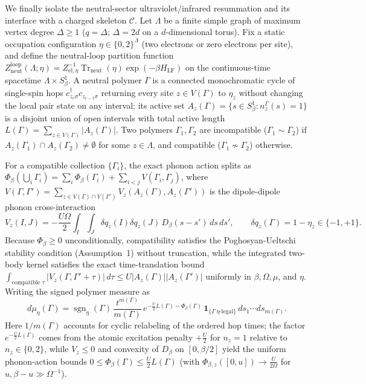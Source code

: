 \documentclass[11pt]{article}
\theoremstyle{definition}
\theoremstyle{remark}
\DeclareMathOperator{\Tr}{Tr}
\begin{document}
We finally isolate the neutral-sector ultraviolet/infrared resummation and its
interface with a charged skeleton $\mathcal{C}$. Let $\Lambda$ be a finite simple
graph of maximum vertex degree $\Delta \ge 1$ ($q = \Delta$; $\Delta = 2d$ on a
$d$-dimensional torus). Fix a static occupation configuration $\eta \in \{0,2\}^\Lambda$
(two electrons or zero electrons per site), and define the neutral-loop partition
function $Z_{\mathrm{neut}}^{\mathrm{loop}}(\Lambda; \eta) = Z_{\mathrm{el},\eta}^{-1} \Tr_{\mathrm{neut}}(\eta)\exp(-\beta H_{\mathrm{LF}})$
on the continuous-time spacetime $\Lambda \times S^1_\beta$. A neutral polymer
$\Gamma$ is a connected monochromatic cycle of single-spin hops $c_{z_r\sigma}^\dagger c_{z_{r-1}\sigma}$
returning every site $z \in V(\Gamma)$ to $\eta_z$ without changing the local
pair state on any interval; its active set $A_z(\Gamma) = \{s \in S^1_\beta : n_z^{\Gamma}(s) = 1\}$
is a disjoint union of open intervals with total active length
$L(\Gamma) = \sum_{z \in V(\Gamma)} |A_z(\Gamma)|$. Two polymers $\Gamma_1, \Gamma_2$
are incompatible ($\Gamma_1 \sim \Gamma_2$) if $A_z(\Gamma_1) \cap A_z(\Gamma_2) \ne \emptyset$
for some $z \in \Lambda$, and compatible ($\Gamma_1 \not\sim \Gamma_2$) otherwise.

For a compatible collection $\{\Gamma_i\}$, the exact phonon action splits as
$\Phi_\beta(\bigcup_i \Gamma_i) = \sum_i \Phi_\beta(\Gamma_i) + \sum_{i < j} V(\Gamma_i, \Gamma_j)$,
where $V(\Gamma, \Gamma') = \sum_{z \in V(\Gamma) \cap V(\Gamma')} V_z(A_z(\Gamma), A_z(\Gamma'))$
is the dipole-dipole phonon cross-interaction
\[
V_z(I, J) = -\frac{U\Omega}{2} \int_I \int_J \delta q_z(I)\delta q_z(J)\, D_\beta(s - s')\,ds\,ds',
\qquad
\delta q_z(\Gamma) = 1 - \eta_z \in \{-1, +1\}.
\]
Because $\Phi_\beta \ge 0$ unconditionally, compatibility satisfies the
Poghosyan-Ueltschi~\cite{poghosyan2009} stability condition (Assumption~1)
without truncation, while the integrated two-body kernel satisfies the exact
time-translation bound $\int_{\text{compatible } \tau} |V_z(\Gamma, \Gamma' + \tau)|\,d\tau \le U |A_z(\Gamma)| |A_z(\Gamma')|$
uniformly in $\beta, \Omega, \mu$, and $\eta$. Writing the signed polymer measure as
\[
d\mu_\eta(\Gamma) = \operatorname{sgn}_\eta(\Gamma)\,
\frac{t^{m(\Gamma)}}{m(\Gamma)}\,
e^{-\frac{U}{2}L(\Gamma)-\Phi_\beta(\Gamma)}\,
\mathbf{1}_{\{\Gamma\ \eta\text{-legal}\}}\,ds_1\cdots ds_{m(\Gamma)}.
\]
Here $1/m(\Gamma)$ accounts for cyclic relabeling of the ordered hop times;
the factor $e^{-\frac{U}{2}L(\Gamma)}$ comes from the atomic excitation penalty
$+\frac{U}{2}$ for $n_z = 1$ relative to $n_z \in \{0,2\}$, while $V_z \le 0$ and
convexity of $D_\beta$ on $[0,\beta/2]$ yield the uniform phonon-action bounds
$0 \le \Phi_\beta(\Gamma) \le \frac{U}{2} L(\Gamma)$ (with $\Phi_{\beta,z}([0,u]) \to \frac{U}{2\Omega}$ for $u, \beta - u \gg \Omega^{-1}$).
\end{document}
